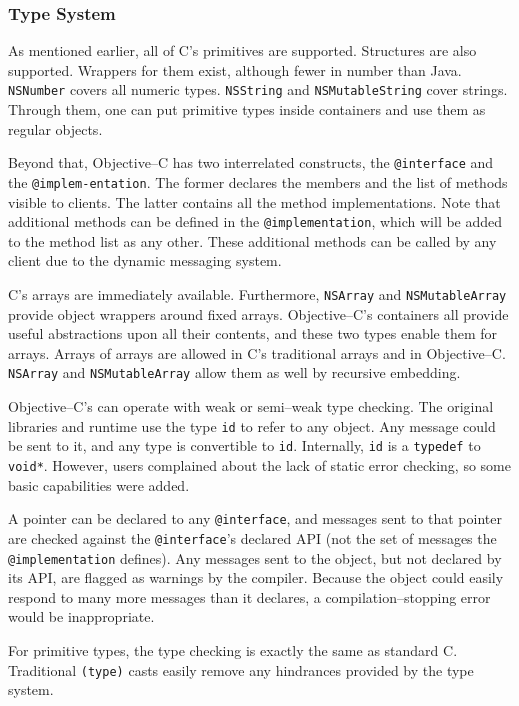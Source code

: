 \subsubsection{Type System}
	As mentioned earlier, all of C's primitives are supported.  Structures are also supported.  Wrappers for them exist, although fewer in number than Java.  \texttt{NSNumber} covers all numeric types.  \texttt{NSString} and \texttt{NSMutableString} cover strings.  Through them, one can put primitive types inside containers and use them as regular objects.

	  Beyond that, Objective--C has two interrelated constructs, the \texttt{@interface} and the \texttt{@impl\-em\--ent\-at\-ion}.  The former declares the members and the list of methods visible to clients.  The latter contains all the method implementations.  Note that additional methods can be defined in the \texttt{@implementation}, which will be added to the method list as any other.  These additional methods can be called by any client due to the dynamic messaging system.

	C's arrays are immediately available.  Furthermore, \texttt{NSArr\-ay} and \texttt{NSM\-ut\-ab\-le\-Arr\-ay} provide object wrappers around fixed arrays.  Objective--C's containers all provide useful abstractions upon all their contents, and these two types enable them for arrays.  Arrays of arrays are allowed in C's traditional arrays and in Objective--C.  \texttt{NSArr\-ay} and \texttt{NSM\-ut\-ab\-le\-Arr\-ay} allow them as well by recursive embedding.

	Objective--C's can operate with weak or semi--weak type checking.  The original libraries and runtime use the type \texttt{id} to refer to any object.  Any message could be sent to it, and any type is convertible to \texttt{id}.  Internally, \texttt{id} is a \texttt{typedef} to \texttt{void*}.  However, users complained about the lack of static error checking, so some basic capabilities were added.

	A pointer can be declared to any \texttt{@interface}, and messages sent to that pointer are checked against the \texttt{@interface}'s declared API (not the set of messages the \texttt{@implementation} defines).  Any messages sent to the object, but not declared by its API, are flagged as warnings by the compiler.  Because the object could easily respond to many more messages than it declares, a compilation--stopping error would be inappropriate.

	For primitive types, the type checking is exactly the same as standard C.  Traditional \texttt{(type)} casts easily remove any hindrances provided by the type system.

